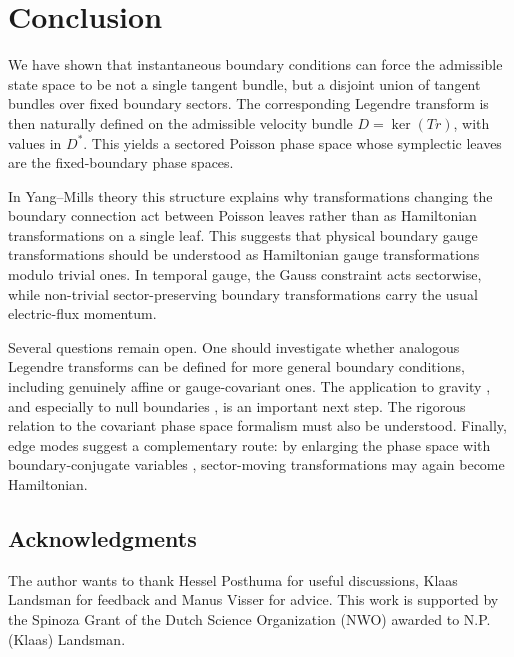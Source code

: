 \documentclass{article}
\theoremstyle{definition}
\begin{document}
\section{Conclusion}

We have shown that instantaneous boundary conditions can force the admissible state space to be not a single tangent bundle, but a disjoint union of tangent bundles over fixed boundary sectors. The corresponding Legendre transform is then naturally defined on the admissible velocity bundle \(D=\ker(Tr)\), with values in \(D^*\). This yields a sectored Poisson phase space whose symplectic leaves are the fixed-boundary phase spaces.

In Yang--Mills theory this structure explains why transformations changing the boundary connection act between Poisson leaves rather than as Hamiltonian transformations on a single leaf. This suggests that physical boundary gauge transformations should be understood as Hamiltonian gauge transformations modulo trivial ones. In temporal gauge, the Gauss constraint acts sectorwise, while non-trivial sector-preserving boundary transformations carry the usual electric-flux momentum.

Several questions remain open. One should investigate whether analogous Legendre transforms can be defined for more general boundary conditions, including genuinely affine or gauge-covariant ones. The application to gravity \cite{Regge:1974zd}, and especially to null boundaries \cite{Ashtekar:1978zz,Ashtekar:1981bq}, is an important next step. The rigorous relation to the covariant phase space formalism \cite{Crnkovic:1986ex,Lee:1990nz} must also be understood. Finally, edge modes suggest a complementary route: by enlarging the phase space with boundary-conjugate variables \cite{donnellyLocalSubsystemsGauge2016a,rielloEdgeModesEdge2021}, sector-moving transformations may again become Hamiltonian.

\subsection*{Acknowledgments}

The author wants to thank Hessel Posthuma for useful discussions, Klaas Landsman for feedback and Manus Visser for advice. This work is supported by the Spinoza Grant of the Dutch Science Organization (NWO) awarded to N.P. (Klaas) Landsman.



 

\end{document}
